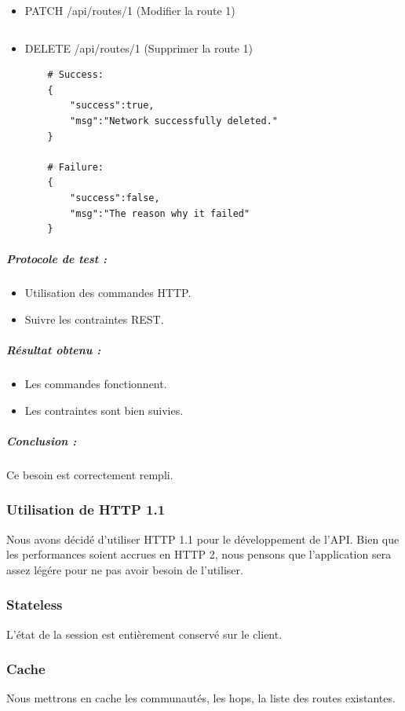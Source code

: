 \begin{itemize}
    \item PATCH /api/routes/1 (Modifier la route 1)
    \begin{verbatim}
    \end{verbatim}
    
    \item DELETE /api/routes/1 (Supprimer la route 1)
    \begin{verbatim}
    # Success:
    {
        "success":true,
        "msg":"Network successfully deleted."
    }
    
    # Failure:
    {
        "success":false,
        "msg":"The reason why it failed"
    }
    \end{verbatim}
    
\end{itemize}

\subparagraph{Protocole de test :}
\begin{itemize}
    \item Utilisation des commandes HTTP.
    \item Suivre les contraintes REST.
\end{itemize}
\subparagraph{Résultat obtenu :}
    \begin{itemize}
    \item Les commandes fonctionnent.
    \item Les contraintes sont bien suivies.
\end{itemize}
\subparagraph{Conclusion :}Ce besoin est correctement rempli.

\subsubsection{Utilisation de HTTP 1.1}
Nous avons décidé d'utiliser HTTP 1.1 pour le développement de l'API. Bien que les performances soient accrues en HTTP 2, nous pensons que l'application sera assez légére pour ne pas avoir besoin de l'utiliser.



\subsubsection{Stateless}
L’état de la session est entièrement conservé sur le client.

\subsubsection{Cache}
Nous mettrons en cache les communautés, les hops, la liste des routes existantes.


